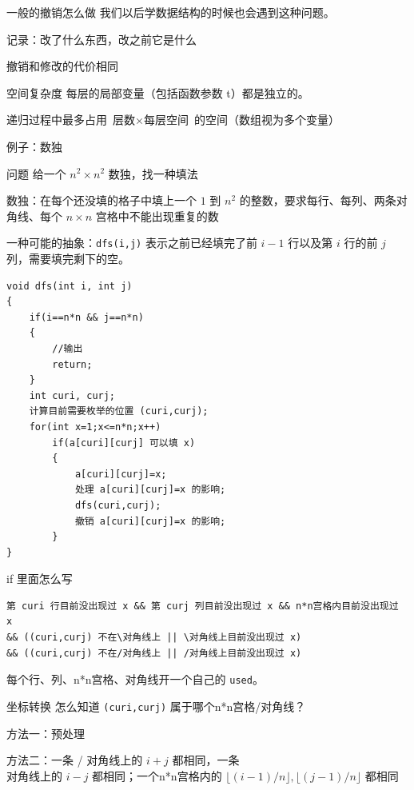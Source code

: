 \documentclass[11pt,aspectratio=169]{beamer}
\begin{document}
\begin{frame}{一般的撤销怎么做}
    我们以后学数据结构的时候也会遇到这种问题。

    记录：改了什么东西，改之前它是什么

    撤销和修改的代价相同
\end{frame}

\begin{frame}{空间复杂度}
    每层的局部变量（包括函数参数 t）都是独立的。
    
    递归过程中最多占用 $\text{层数}\times \text{每层空间}$ 的空间（数组视为多个变量）
\end{frame}

\begin{frame}{例子：数独}
    \begin{block}{问题}
        给一个 $n^2\times n^2$ 数独，找一种填法

        数独：在每个还没填的格子中填上一个 $1$ 到 $n^2$ 的整数，要求每行、每列、两条对角线、每个 $n\times n$ 宫格中不能出现重复的数
    \end{block}
    \pause
    一种可能的抽象：\texttt{dfs(i,j)} 表示之前已经填完了前 $i-1$ 行以及第 $i$ 行的前 $j$ 列，需要填完剩下的空。 
\end{frame}
\begin{frame}[fragile]
\begin{lstlisting}
void dfs(int i, int j)
{
    if(i==n*n && j==n*n)
    {
        //输出
        return;
    }
    int curi, curj;
    计算目前需要枚举的位置 (curi,curj);
    for(int x=1;x<=n*n;x++)
        if(a[curi][curj] 可以填 x)
        {
            a[curi][curj]=x;
            处理 a[curi][curj]=x 的影响;
            dfs(curi,curj);
            撤销 a[curi][curj]=x 的影响;
        }
}
\end{lstlisting}
\end{frame}
\begin{frame}[fragile]{if 里面怎么写}
\begin{lstlisting}
第 curi 行目前没出现过 x && 第 curj 列目前没出现过 x && n*n宫格内目前没出现过 x
&& ((curi,curj) 不在\对角线上 || \对角线上目前没出现过 x)
&& ((curi,curj) 不在/对角线上 || /对角线上目前没出现过 x)
\end{lstlisting}

每个行、列、n*n宫格、对角线开一个自己的 \texttt{used}。
\end{frame}

\begin{frame}{坐标转换}
    怎么知道 \texttt{(curi,curj)} 属于哪个n*n宫格/对角线？

    方法一：预处理

    方法二：一条 / 对角线上的 $i+j$ 都相同，一条 \\ 对角线上的 $i-j$ 都相同；一个n*n宫格内的 $\lfloor (i-1)/n\rfloor,\lfloor (j-1)/n\rfloor$ 都相同
\end{frame}
\end{document}
